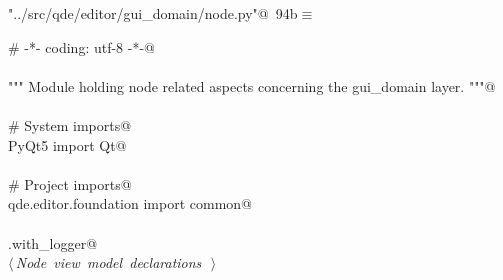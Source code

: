 \documentclass[
    a4paper,      %
    10pt,         %
    openright,    %
    notitlepage,  %
    parskip=half, %
]{scrreprt}       %
\theoremstyle{definition}                    %
\begin{document}
\begin{flushleft} \small
\begin{minipage}{\linewidth}\label{scrap155}\raggedright\small
{} \verb@"../src/qde/editor/gui_domain/node.py"@\nobreak\ {\footnotesize {94b}}$\equiv$
\vspace{-1ex}
\begin{list}{}{} \item
\mbox{}\lstinline@# -*- coding: utf-8 -*-@\\
\mbox{}\lstinline@@\\
\mbox{}\lstinline@""" Module holding node related aspects concerning the gui_domain layer. """@\\
\mbox{}\lstinline@@\\
\mbox{}\lstinline@# System imports@\\
\mbox{}\lstinline@from PyQt5 import Qt@\\
\mbox{}\lstinline@@\\
\mbox{}\lstinline@# Project imports@\\
\mbox{}\lstinline@from qde.editor.foundation import common@\\
\mbox{}\lstinline@@\\
\mbox{}\lstinline@common.with_logger@\\
\mbox{}\lstinline@@\hbox{$\langle\,${\itshape Node view model declarations}\nobreak\ {\footnotesize {}}$\,\rangle$}\lstinline@@\\
\mbox{}\lstinline@@{\NWsep}
\end{list}
\vspace{-1.5ex}
\footnotesize
\begin{list}{}{\setlength{\itemsep}{-\parsep}\setlength{\itemindent}{-\leftmargin}}

\item{}
\end{list}
\end{minipage}\vspace{4ex}
\end{flushleft}
\end{document}
